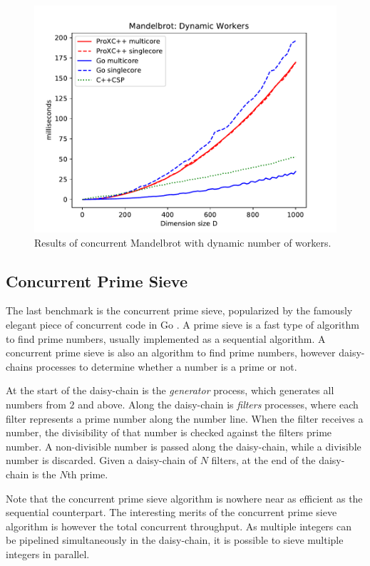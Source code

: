\begin{figure}[h!]
    \centering
    \includegraphics[width=0.9\linewidth]{fig/mandelbrot_dynamic}
    \caption{Results of concurrent Mandelbrot with dynamic number of workers.}
    \label{fig:mandelbrot_dynamic}
\end{figure}


\FloatBarrier
\subsection{Concurrent Prime Sieve}


The last benchmark is the concurrent prime sieve, popularized by the famously elegant piece of concurrent code in Go \citep{go2017primesieve}. A prime sieve is a fast type of algorithm to find prime numbers, usually implemented as a sequential algorithm. A concurrent prime sieve is also an algorithm to find prime numbers, however daisy\hyp{}chains processes to determine whether a number is a prime or not. 

At the start of the daisy\hyp{}chain is the \textit{generator} process, which generates all numbers from $2$ and above. Along the daisy\hyp{}chain is \textit{filters} processes, where each filter represents a prime number along the number line. When the filter receives a number, the divisibility of that number is checked against the filters prime number. A non\hyp{}divisible number is passed along the daisy\hyp{}chain, while a divisible number is discarded. Given a daisy\hyp{}chain of $N$ filters, at the end of the daisy\hyp{}chain is the $N$th prime.

Note that the concurrent prime sieve algorithm is nowhere near as efficient as the sequential counterpart. The interesting merits of the concurrent prime sieve algorithm is however the total concurrent throughput. As multiple integers can be pipelined simultaneously in the daisy\hyp{}chain, it is possible to sieve multiple integers in parallel.

